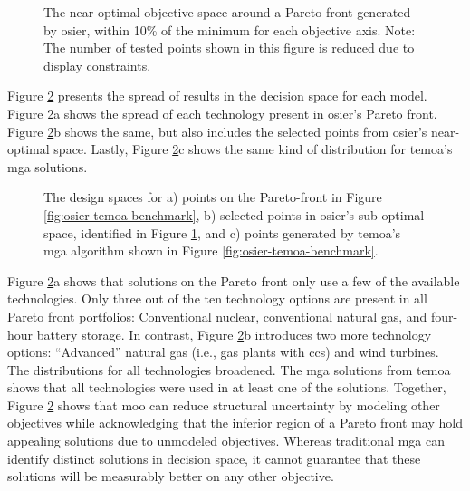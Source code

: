\begin{figure}[ht!]
    \begin{center}
        \resizebox{\columnwidth}{!}{}
        \caption{The near-optimal objective space around a Pareto front generated by
        \gls{osier}, within 10\% of the minimum for each objective axis. Note:
        The number of tested points shown in this figure is reduced due to
        display constraints.}
        \label{fig:osier-near-optimal}
    \end{center}
\end{figure}

Figure \ref{fig:temoa-benchmark-03} presents the spread of results in
the decision space for each model. Figure \ref{fig:temoa-benchmark-03}a shows
the spread of each technology present in \gls{osier}'s Pareto front. Figure
\ref{fig:temoa-benchmark-03}b shows the same, but also includes the
selected points from \gls{osier}'s near-optimal space. Lastly, Figure
\ref{fig:temoa-benchmark-03}c shows the same kind of distribution for
\gls{temoa}'s \gls{mga} solutions.

\begin{figure}[ht!]
  \centering
  \resizebox{\columnwidth}{!}{}
  \caption{The design spaces for a) points on the Pareto-front in Figure
  \ref{fig:osier-temoa-benchmark}, b) selected points in \gls{osier}'s sub-optimal
  space, identified in Figure \ref{fig:osier-near-optimal}, and c) points
  generated by \gls{temoa}'s \gls{mga} algorithm shown in Figure
  \ref{fig:osier-temoa-benchmark}.}
  \label{fig:temoa-benchmark-03}
\end{figure}

Figure \ref{fig:temoa-benchmark-03}a shows that solutions on the Pareto front
only use a few of the available technologies. Only three out of the ten technology
options are present in all Pareto front portfolios: Conventional nuclear, conventional
natural gas, and four-hour battery storage. In contrast, Figure \ref{fig:temoa-benchmark-03}b 
introduces two more technology options: ``Advanced'' natural gas (i.e., gas plants 
with \gls{ccs}) and wind turbines. The distributions for all technologies broadened.
The \gls{mga} solutions from \gls{temoa} shows that all technologies were used in 
at least one of the solutions. Together, Figure \ref{fig:temoa-benchmark-03} shows 
that \gls{moo} can reduce structural uncertainty by modeling other objectives while 
acknowledging that the inferior region of a Pareto front may hold appealing solutions
due to unmodeled objectives. Whereas traditional \gls{mga} can identify distinct 
solutions in decision space, it cannot guarantee that these solutions will be
measurably better on any other objective.

